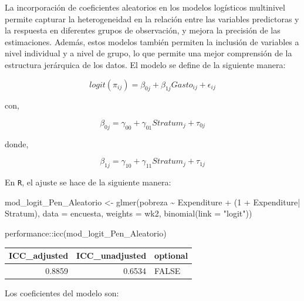 \documentclass[
  12pt,
]{book}
\newenvironment{Shaded}{\begin{snugshade}}{\end{snugshade}}
\newcommand{\AttributeTok}[1]{\textcolor[rgb]{0.77,0.63,0.00}{#1}}
\newcommand{\DecValTok}[1]{\textcolor[rgb]{0.00,0.00,0.81}{#1}}
\newcommand{\FunctionTok}[1]{\textcolor[rgb]{0.00,0.00,0.00}{#1}}
\newcommand{\NormalTok}[1]{#1}
\newcommand{\OtherTok}[1]{\textcolor[rgb]{0.56,0.35,0.01}{#1}}
\newcommand{\SpecialCharTok}[1]{\textcolor[rgb]{0.00,0.00,0.00}{#1}}
\newcommand{\StringTok}[1]{\textcolor[rgb]{0.31,0.60,0.02}{#1}}
\begin{document}
La incorporación de coeficientes aleatorios en los modelos logísticos multinivel permite capturar la heterogeneidad en la relación entre las variables predictoras y la respuesta en diferentes grupos de observación, y mejora la precisión de las estimaciones. Además, estos modelos también permiten la inclusión de variables a nivel individual y a nivel de grupo, lo que permite una mejor comprensión de la estructura jerárquica de los datos. El modelo se define de la siguiente manera:

\[
logit(\pi_{ij})=\beta_{0j}+\beta_{1j}Gasto_{ij}+\epsilon_{ij}
\]

con,

\[
\beta_{0j} = \gamma_{00}+\gamma_{01}Stratum_{j} + \tau_{0j}
\]

donde,

\[
\beta_{1j} = \gamma_{10}+\gamma_{11}Stratum_{j} + \tau_{1j}
\]

En \texttt{R}, el ajuste se hace de la siguiente manera:

\begin{Shaded}
\begin{Highlighting}[]
\NormalTok{mod\_logit\_Pen\_Aleatorio }\OtherTok{\textless{}{-}} \FunctionTok{glmer}\NormalTok{(pobreza }\SpecialCharTok{\textasciitilde{}}\NormalTok{ Expenditure  }\SpecialCharTok{+}\NormalTok{ (}\DecValTok{1} \SpecialCharTok{+}\NormalTok{ Expenditure}\SpecialCharTok{|}\NormalTok{ Stratum),}
  \AttributeTok{data =}\NormalTok{ encuesta, }\AttributeTok{weights  =}\NormalTok{  wk2, }\FunctionTok{binomial}\NormalTok{(}\AttributeTok{link =} \StringTok{"logit"}\NormalTok{))}

\NormalTok{performance}\SpecialCharTok{::}\FunctionTok{icc}\NormalTok{(mod\_logit\_Pen\_Aleatorio)}
\end{Highlighting}
\end{Shaded}

\begin{tabular}{r|r|l}
\hline
ICC\_adjusted & ICC\_unadjusted & optional\\
\hline
0.8859 & 0.6534 & FALSE\\
\hline
\end{tabular}

Los coeficientes del modelo son:

\begin{Shaded}
\end{Shaded}
\end{document}

